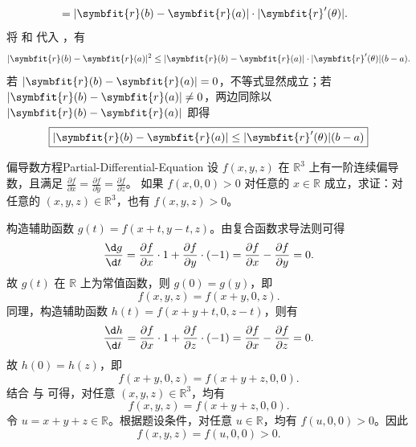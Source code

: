 \begin{myproof}
\begin{equation}
\begin{aligned}
                             & = |\symbfit{r}(b) - \symbfit{r}(a)| \cdot |\symbfit{r}'(\theta)|.
        \end{aligned} \label{eq:cauchy-schwarz}
    \end{equation}
    将  和  代入 ，有
    \begin{equation}
        |\symbfit{r}(b) - \symbfit{r}(a)|^2 \le |\symbfit{r}(b) - \symbfit{r}(a)| \cdot |\symbfit{r}'(\theta)| (b - a).
    \end{equation}
    若 $|\symbfit{r}(b) - \symbfit{r}(a)| = 0$，不等式显然成立；若 $|\symbfit{r}(b) - \symbfit{r}(a)| \ne 0$，两边同除以 $|\symbfit{r}(b) - \symbfit{r}(a)|$ 即得
    \begin{equation}
        \boxed{|\symbfit{r}(b) - \symbfit{r}(a)| \le |\symbfit{r}'(\theta)|(b - a)}
    \end{equation}
\end{myproof}


\begin{problem}{偏导数方程}{Partial-Differential-Equation}
    设 $f(x,y,z)$ 在 $\mathbb{R}^3$ 上有一阶连续偏导数，且满足 $\frac{\partial f}{\partial x} = \frac{\partial f}{\partial y} = \frac{\partial f}{\partial z}$。 如果 $f(x,0,0) > 0$ 对任意的 $x \in \mathbb{R}$ 成立，求证：对任意的 $(x,y,z) \in \mathbb{R}^3$，也有 $f(x,y,z) > 0$。
\end{problem}

\begin{myproof}
    构造辅助函数 $g(t) = f(x+t, y-t, z)$。由复合函数求导法则可得
    \begin{equation}
        \frac{\d g}{\d t} = \frac{\partial f}{\partial x} \cdot 1 + \frac{\partial f}{\partial y} \cdot (-1) = \frac{\partial f}{\partial x} - \frac{\partial f}{\partial y} = 0.
    \end{equation}
    故 $g(t)$ 在 $\mathbb{R}$ 上为常值函数，则 $g(0) = g(y)$，即
    \begin{equation}
        \label{eq:step1}
        f(x,y,z) = f(x+y, 0, z).
    \end{equation}
    同理，构造辅助函数 $h(t) = f(x+y+t, 0, z-t)$，则有
    \begin{equation}
        \frac{\d h}{\d t} = \frac{\partial f}{\partial x} \cdot 1 + \frac{\partial f}{\partial z} \cdot (-1) = \frac{\partial f}{\partial x} - \frac{\partial f}{\partial z} = 0.
    \end{equation}
    故 $h(0) = h(z)$，即
    \begin{equation}
        \label{eq:step2}
        f(x+y, 0, z) = f(x+y+z, 0, 0).
    \end{equation}
    结合  与  可得，对任意 $(x,y,z) \in \mathbb{R}^3$，均有
    \begin{equation}
        f(x,y,z) = f(x+y+z, 0, 0).
    \end{equation}
    令 $u = x+y+z \in \mathbb{R}$。根据题设条件，对任意 $u \in \mathbb{R}$，均有 $f(u,0,0) > 0$。因此
    \begin{equation}
        f(x,y,z) = f(u, 0, 0) > 0.
    \end{equation}
\end{myproof}


